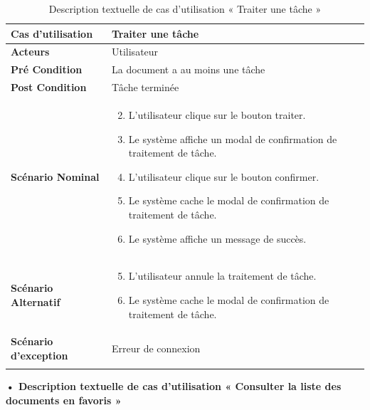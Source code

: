 \begin{longtable}{|p{5cm}|p{10cm}|}
\hline
\textbf{Cas d'utilisation}&Traiter une tâche\\
\hline
\textbf{Acteurs}&Utilisateur\\
\hline
\textbf{Pré Condition}&La document a au moins une tâche\\
\hline
\textbf{Post Condition}&Tâche terminée\\
\hline
\textbf{Scénario Nominal}&
\vspace{-\baselineskip}
\begin{enumerate}
    \setcounter{enumi}{1}
    \item L'utilisateur clique sur le bouton traiter.
    \item Le système affiche un modal de confirmation de traitement de tâche.
    \item L'utilisateur clique sur le bouton confirmer.
    \item Le système cache le modal de confirmation de traitement de tâche.
    \item Le système affiche un message de succès.
\end{enumerate}\\
\hline
\textbf{Scénario Alternatif}&
\vspace{-\baselineskip}
\begin{enumerate}
    \setcounter{enumi}{4}
    \item L'utilisateur annule la traitement de tâche.
    \item Le système cache le modal de confirmation de traitement de tâche.
\end{enumerate}\\
\hline
\textbf{Scénario d'exception}&Erreur de connexion\\
\hline
\caption{Description textuelle de cas d'utilisation « Traiter une tâche »}
\label{tab:DescriptionTextuelleDeCasDUtilisationTraiterUneTache}
\end{longtable}



\textbf{•	Description textuelle de cas d'utilisation « Consulter la liste des documents en favoris  »}

